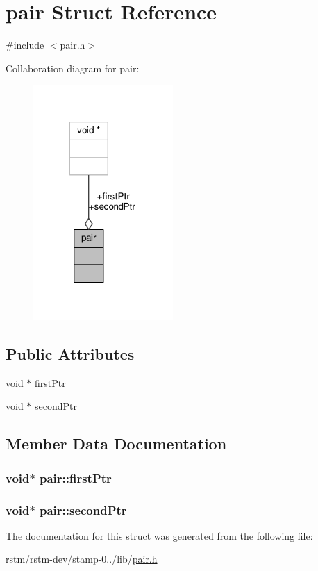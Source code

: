 \hypertarget{structpair}{\section{pair Struct Reference}
\label{structpair}
}


{\ttfamily \#include $<$pair.\-h$>$}



Collaboration diagram for pair\-:
\nopagebreak
\begin{figure}[H]
\begin{center}
\leavevmode
\includegraphics[width=151pt]{structpair__coll__graph}
\end{center}
\end{figure}
\subsection*{Public Attributes}
\begin{DoxyCompactItemize}
\item 
void $\ast$ \hyperlink{structpair_a0f915908de7e5c319acd4787bee5890e}{first\-Ptr}
\item 
void $\ast$ \hyperlink{structpair_a80152fc45e5dfad55ebb9439b2200003}{second\-Ptr}
\end{DoxyCompactItemize}


\subsection{Member Data Documentation}
\hypertarget{structpair_a0f915908de7e5c319acd4787bee5890e}{
\subsubsection[{first\-Ptr}]{\setlength{\rightskip}{0pt plus 5cm}void$\ast$ pair\-::first\-Ptr}}\label{structpair_a0f915908de7e5c319acd4787bee5890e}
\hypertarget{structpair_a80152fc45e5dfad55ebb9439b2200003}{
\subsubsection[{second\-Ptr}]{\setlength{\rightskip}{0pt plus 5cm}void$\ast$ pair\-::second\-Ptr}}\label{structpair_a80152fc45e5dfad55ebb9439b2200003}


The documentation for this struct was generated from the following file\-:\begin{DoxyCompactItemize}
\item 
rstm/rstm-\/dev/stamp-\/0../lib/\hyperlink{pair_8h}{pair.\-h}\end{DoxyCompactItemize}
